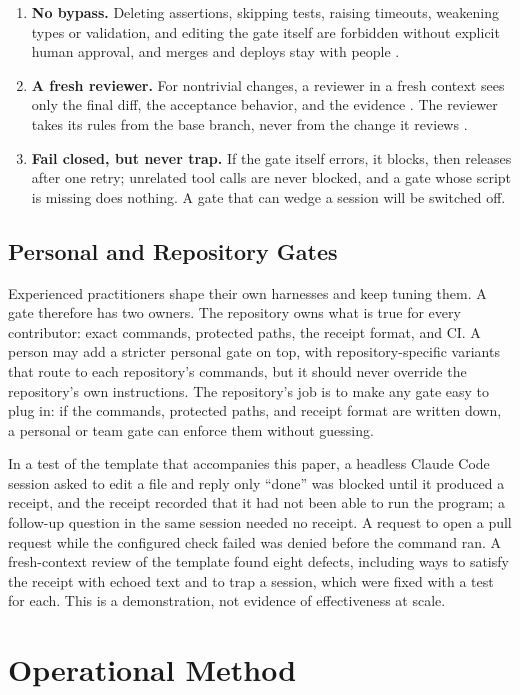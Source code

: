 \documentclass[11pt]{article}
\begin{document}
\begin{enumerate}[leftmargin=*]
  \item \textbf{No bypass.} Deleting assertions, skipping tests, raising timeouts, weakening types or validation, and editing the gate itself are forbidden without explicit human approval, and merges and deploys stay with people \cite{anthropic2026block}.
  \item \textbf{A fresh reviewer.} For nontrivial changes, a reviewer in a fresh context sees only the final diff, the acceptance behavior, and the evidence \cite{osmani2026codereview,anthropic2026bestpractices}. The reviewer takes its rules from the base branch, never from the change it reviews \cite{osmani2026verification}.
  \item \textbf{Fail closed, but never trap.} If the gate itself errors, it blocks, then releases after one retry; unrelated tool calls are never blocked, and a gate whose script is missing does nothing. A gate that can wedge a session will be switched off.
\end{enumerate}

\subsection{Personal and Repository Gates}
Experienced practitioners shape their own harnesses and keep tuning them. A gate therefore has two owners. The repository owns what is true for every contributor: exact commands, protected paths, the receipt format, and CI. A person may add a stricter personal gate on top, with repository-specific variants that route to each repository's commands, but it should never override the repository's own instructions. The repository's job is to make any gate easy to plug in: if the commands, protected paths, and receipt format are written down, a personal or team gate can enforce them without guessing.

In a test of the template that accompanies this paper, a headless Claude Code session asked to edit a file and reply only ``done'' was blocked until it produced a receipt, and the receipt recorded that it had not been able to run the program; a follow-up question in the same session needed no receipt. A request to open a pull request while the configured check failed was denied before the command ran. A fresh-context review of the template found eight defects, including ways to satisfy the receipt with echoed text and to trap a session, which were fixed with a test for each. This is a demonstration, not evidence of effectiveness at scale.

\section{Operational Method}
\end{document}
